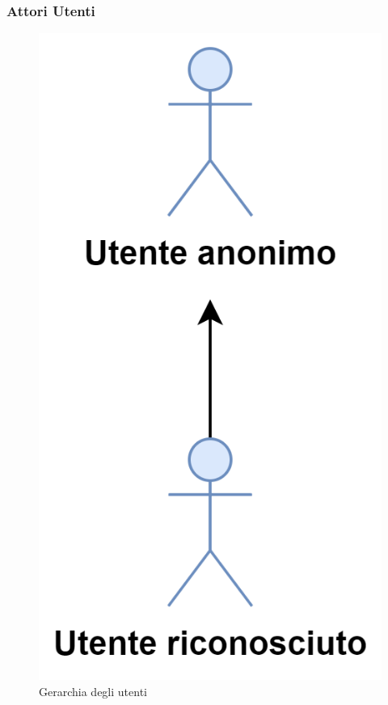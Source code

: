 \subsubsection{Attori Utenti}
\begin{figure}[h]
  \centering
    \includegraphics[scale=0.8]{Sezioni/UseCase/Immagini/Utenti.png}
    \caption{Gerarchia degli utenti}
\end{figure}

